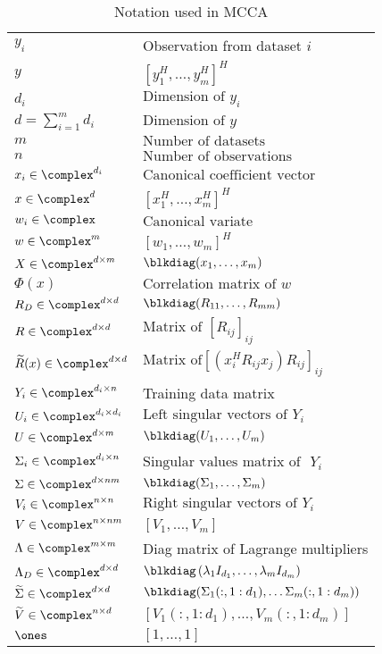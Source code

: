 \begin{table*}[h!]
  \centering
  \begin{tabular}{ll}
    \midrule
    $y_i$ & Observation from dataset $i$ \\
    $y$ &  $[y_1^H,\dots,y_m^H]^H$\\ 
    $d_i$ & $\text{Dimension of } y_i$ \\
    $d=\sum_{i=1}^md_i$& $\text{Dimension of } y$\\ 
    $m$ & $\text{Number of datasets}$ \\
    $n$ & $\text{Number of observations}$\\ 
    $x_i\in\complex^{d_i}$ & $\text{Canonical coefficient vector}$ \\
    $x\in\complex^d$ & $[x_1^H,\dots,x_m^H]^H$\\ 
    $w_i\in\complex$ & $\text{Canonical variate}$\\
    $w\in\complex^m$ & $[w_1,\dots,w_m]^H$\\ 
    $X\in\complex^{d\times m}$ & $\blkdiag(x_1,\dots,x_m)$ \\
    $\Phi(x)$ &  $\text{Correlation matrix of }w$\\ 
    $R_D\in\complex^{d\times d}$ & $\blkdiag(R_{11},\dots,R_{mm})$\\
    $R\in\complex^{d\times d}$ & $\text{Matrix of } [R_{ij}]_{ij}$\\ 
    $\widetilde{R}(x)\in\complex^{d\times d}$ & $\text{Matrix of}
    [(x_i^HR_{ij}x_j)R_{ij}]_{ij}$ \\
    $Y_i\in\complex^{d_i\times n}$ & Training data matrix\\
    $U_i\in\complex^{d_i\times d_i}$ & $\text{Left singular vectors of } Y_i$\\
    $U\in\complex^{d\times m}$ & $\blkdiag(U_1,\dots,U_m)$\\ 
    $\Sigma_i\in\complex^{d_i\times n}$ & $\text{Singular values matrix of }$ $Y_i$\\
    $\Sigma\in\complex^{d\times nm}$ & $\blkdiag(\Sigma_1,\dots,\Sigma_m)$\\ 
    $V_i\in\complex^{n\times n}$ & $\text{Right singular vectors of } Y_i$\\
    $V\in\complex^{n\times nm}$ & $[V_1,\dots,V_m]$\\ 
    $\Lambda\in\complex^{m\times m}$ & Diag matrix of Lagrange multipliers\\
    $\Lambda_D\in\complex^{d\times d}$ & $\blkdiag\left(\lambda_1 I_{d_1},\dots,\lambda_m
      I_{d_m}\right)$\\  
    $\widetilde{\Sigma}\in\complex^{d\times d}$ & $\blkdiag(\Sigma_1(:,1:d_1),\dots
    \Sigma_m(:,1:d_m))$\\ 
    $\widetilde{V}\in\complex^{n\times  d}$&$[V_1(:,1:d_1),\dots,V_m(:,1:d_m)]$ \\
    $\ones$ & $\left[1,\dots,1\right]$\\
    \midrule
  \end{tabular}
  \caption{Notation used in MCCA}
  \label{tab:mcca_notation}
\end{table*}

